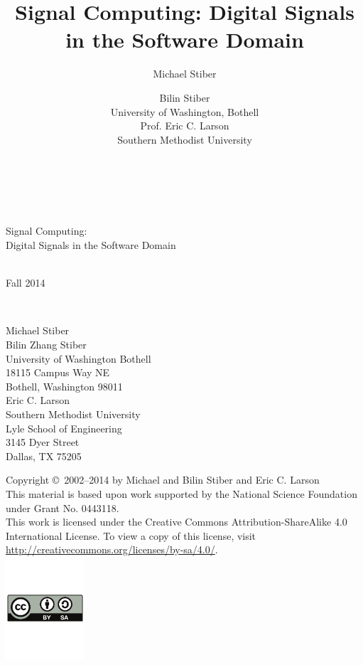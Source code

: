 \documentclass[12pt]{book}
\title{Signal Computing: Digital Signals in the Software Domain}
\author{Michael Stiber \and Bilin Stiber\\ 
{\normalsize University of Washington, Bothell}\\
{\normalsize Prof. Eric C. Larson}\\
{\normalsize Southern Methodist University}}
\begin{document}
\begin{titlepage}

\mbox{}\\[0.5in]
\begin{center}
\mbox{}\hrulefill\mbox{}\\[0.25in]
{\Huge Signal Computing:}\\[0.25in]
{\LARGE Digital Signals in the Software Domain}\\[0.25in]
\mbox{}\hrulefill\mbox{}\\[3in]

\mbox{}\hfill
\parbox{1.5in}{\mbox{}}
\parbox{3in}{Fall 2014}\\[0.25in]
\mbox{}\hfill
\parbox{3in}{\raggedright
Michael Stiber\\
Bilin Zhang Stiber\\
University of Washington Bothell\\
18115 Campus Way NE\\
Bothell, Washington 98011\\[0.25in]
Eric C. Larson\\
Southern Methodist University\\
Lyle School of Engineering\\
3145 Dyer Street\\
Dallas, TX 75205}
\end{center}

\newpage
\mbox{}\vspace{2in}
\begin{flushright}
Copyright \copyright\ 2002--2014 by Michael and Bilin Stiber and Eric
C. Larson\\[1in]
This material is based upon work supported by the National Science
Foundation under Grant No. 0443118.\\[2in]
This work is licensed under the Creative Commons
Attribution-ShareAlike 4.0 International License. To view a copy of
this license, visit
\url{http://creativecommons.org/licenses/by-sa/4.0/}.\\
\includegraphics[height=1.5in]{by-sa}
\end{flushright}

\thispagestyle{empty}

\end{titlepage}
\end{document}
